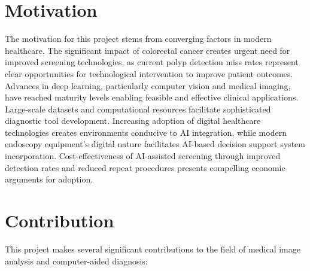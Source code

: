 \documentclass[a4paper,12pt]{report}
\begin{document}
    \section{Motivation}
    The motivation for this project stems from converging factors in modern healthcare. The significant impact of colorectal cancer creates urgent need for improved screening technologies, as current polyp detection miss rates represent clear opportunities for technological intervention to improve patient outcomes. Advances in deep learning, particularly computer vision and medical imaging, have reached maturity levels enabling feasible and effective clinical applications. Large-scale datasets and computational resources facilitate sophisticated diagnostic tool development. Increasing adoption of digital healthcare technologies creates environments conducive to AI integration, while modern endoscopy equipment's digital nature facilitates AI-based decision support system incorporation. Cost-effectiveness of AI-assisted screening through improved detection rates and reduced repeat procedures presents compelling economic arguments for adoption.

    \section{Contribution}

This project makes several significant contributions to the field of medical image analysis and computer-aided diagnosis:
\end{document}
